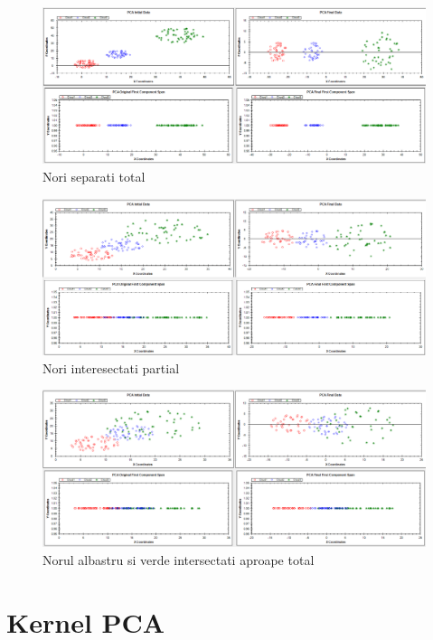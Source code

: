 \documentclass[12pt,oneside]{article}
\begin{document}
\begin{figure}[H]
	\caption{Nori separati total}
	\centering
	\includegraphics[width=\linewidth]{threecloud1}
\end{figure}


\begin{figure}[H]
\caption{Nori interesectati partial}
\centering
\includegraphics[width=\linewidth]{threecloud2}
\end{figure}


\begin{figure}[H]
\centering
\caption{Norul albastru si verde intersectati aproape total}
\includegraphics[width=\linewidth]{threecloud3}
\end{figure}

\newpage
\section{Kernel PCA}
\end{document}
